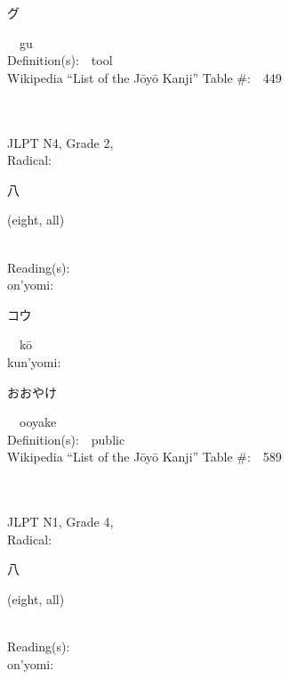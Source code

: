 \begin{multicols}{2}
{\hspace*{2em}}{\begin{CJK}{UTF8}{min} グ \end{CJK}}\ \ gu\ \ \\
Definition(s):\ \ tool \\
Wikipedia ``List of the J\=oy\=o Kanji'' Table \#:\ \ 449 \\
\ \ \\
{\fontsize{34pt}{40pt}  }\ \ \\  %
{JLPT N4, Grade 2, \\Radical:\ \ {\begin{CJK}{UTF8}{min} 八 \end{CJK}} (eight, all) } \\
Reading(s):\ \ \\
{\hspace*{1em}}on'yomi:\ \ \\
{\hspace*{2em}}{\begin{CJK}{UTF8}{min} コウ \end{CJK}}\ \ k\=o\ \ \\
{\hspace*{1em}}kun'yomi:\ \ \\
{\hspace*{2em}}{\begin{CJK}{UTF8}{min} おおやけ \end{CJK}}\ \ ooyake\ \ \\
Definition(s):\ \ public \\
Wikipedia ``List of the J\=oy\=o Kanji'' Table \#:\ \ 589 \\
\ \ \\
{\fontsize{34pt}{40pt}  }\ \ \\  %
{JLPT N1, Grade 4, \\Radical:\ \ {\begin{CJK}{UTF8}{min} 八 \end{CJK}} (eight, all) } \\
Reading(s):\ \ \\
{\hspace*{1em}}on'yomi:\ \ \\

\end{multicols}
